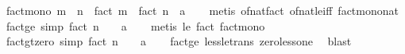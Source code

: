 \begin{isabellebody}
\isanewline
\isanewline
{}\isamarkupfalse%
\ fact{\isacharunderscore}{\kern0pt}mono{\isacharcolon}{\kern0pt}\ {\isachardoublequoteopen}m\ {\isasymle}\ n\ {\isasymLongrightarrow}\ fact\ m\ {\isasymle}\ {\isacharparenleft}{\kern0pt}fact\ n\ {\isacharcolon}{\kern0pt}{\isacharcolon}{\kern0pt}\ {\isacharprime}{\kern0pt}a{\isacharparenright}{\kern0pt}{\isachardoublequoteclose}\isanewline
%
\isadelimproof
\ \ %
\endisadelimproof
%
\isatagproof
{}\isamarkupfalse%
\ {\isacharparenleft}{\kern0pt}metis\ of{\isacharunderscore}{\kern0pt}nat{\isacharunderscore}{\kern0pt}fact\ of{\isacharunderscore}{\kern0pt}nat{\isacharunderscore}{\kern0pt}le{\isacharunderscore}{\kern0pt}iff\ fact{\isacharunderscore}{\kern0pt}mono{\isacharunderscore}{\kern0pt}nat{\isacharparenright}{\kern0pt}%
\endisatagproof
{\isafoldproof}%
%
\isadelimproof
\isanewline
%
\endisadelimproof
\isanewline
{}\isamarkupfalse%
\ fact{\isacharunderscore}{\kern0pt}ge{\isacharunderscore}{\kern0pt}{}\ {\isacharbrackleft}{\kern0pt}simp{\isacharbrackright}{\kern0pt}{\isacharcolon}{\kern0pt}\ {\isachardoublequoteopen}fact\ n\ {\isasymge}\ {\isacharparenleft}{\kern0pt}{}\ {\isacharcolon}{\kern0pt}{\isacharcolon}{\kern0pt}\ {\isacharprime}{\kern0pt}a{\isacharparenright}{\kern0pt}{\isachardoublequoteclose}\isanewline
%
\isadelimproof
\ \ %
\endisadelimproof
%
\isatagproof
{}\isamarkupfalse%
\ {\isacharparenleft}{\kern0pt}metis\ le{}\ fact{\isacharunderscore}{\kern0pt}{}\ fact{\isacharunderscore}{\kern0pt}mono{\isacharparenright}{\kern0pt}%
\endisatagproof
{\isafoldproof}%
%
\isadelimproof
\isanewline
%
\endisadelimproof
\isanewline
{}\isamarkupfalse%
\ fact{\isacharunderscore}{\kern0pt}gt{\isacharunderscore}{\kern0pt}zero\ {\isacharbrackleft}{\kern0pt}simp{\isacharbrackright}{\kern0pt}{\isacharcolon}{\kern0pt}\ {\isachardoublequoteopen}fact\ n\ {\isachargreater}{\kern0pt}\ {\isacharparenleft}{\kern0pt}{}\ {\isacharcolon}{\kern0pt}{\isacharcolon}{\kern0pt}\ {\isacharprime}{\kern0pt}a{\isacharparenright}{\kern0pt}{\isachardoublequoteclose}\isanewline
%
\isadelimproof
\ \ %
\endisadelimproof
%
\isatagproof
{}\isamarkupfalse%
\ fact{\isacharunderscore}{\kern0pt}ge{\isacharunderscore}{\kern0pt}{}\ less{\isacharunderscore}{\kern0pt}le{\isacharunderscore}{\kern0pt}trans\ zero{\isacharunderscore}{\kern0pt}less{\isacharunderscore}{\kern0pt}one\ \isamarkupfalse%
\ blast%
\endisatagproof
{\isafoldproof}%
%
\isadelimproof
\isanewline
%
\endisadelimproof

\end{isabellebody}
